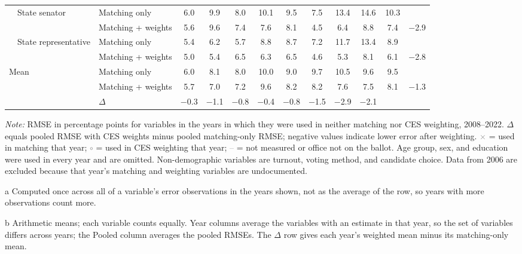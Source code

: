 \begin{table}[!htbp]
{\begin{threeparttable}
\begin{tabular}{llcccccccccc}
\addlinespace[0.1em]
~~State senator & Matching only & 6.0 & 9.9 & 8.0 & 10.1 & 9.5 & 7.5 & 13.4 & 14.6 & 10.3 & \\
 & Matching + weights & 5.6 & 9.6 & 7.4 & 7.6 & 8.1 & 4.5 & 6.4 & 8.8 & 7.4 & $-$2.9 \\
\addlinespace[0.1em]
~~State representative & Matching only & 5.4 & 6.2 & 5.7 & 8.8 & 8.7 & 7.2 & 11.7 & 13.4 & 8.9 & \\
 & Matching + weights & 5.0 & 5.4 & 6.5 & 6.3 & 6.5 & 4.6 & 5.3 & 8.1 & 6.1 & $-$2.8 \\
\midrule
Mean\tnote{b} & Matching only & 6.0 & 8.1 & 8.0 & 10.0 & 9.0 & 9.7 & 10.5 & 9.6 & 9.5 & \\
 & Matching + weights & 5.7 & 7.0 & 7.2 & 9.6 & 8.2 & 8.2 & 7.6 & 7.5 & 8.1 & $-$1.3 \\
 & $\Delta$ & $-$0.3 & $-$1.1 & $-$0.8 & $-$0.4 & $-$0.8 & $-$1.5 & $-$2.9 & $-$2.1 & & \\
\bottomrule
\end{tabular}
\begin{tablenotes}
\footnotesize
\item \textit{Note:} RMSE in percentage points for variables in the years in which they were used in neither matching nor CES weighting, 2008--2022. $\Delta$ equals pooled RMSE with CES weights minus pooled matching-only RMSE; negative values indicate lower error after weighting. \textcolor{gray}{$\times$} = used in matching that year; \textcolor{gray}{$\circ$} = used in CES weighting that year; \textcolor{gray}{--} = not measured or office not on the ballot. Age group, sex, and education were used in every year and are omitted. Non-demographic variables are turnout, voting method, and candidate choice. Data from 2006 are excluded because that year's matching and weighting variables are undocumented.
\item[a] Computed once across all of a variable's error observations in the years shown, not as the average of the row, so years with more observations count more.
\item[b] Arithmetic means; each variable counts equally. Year columns average the variables with an estimate in that year, so the set of variables differs across years; the Pooled column averages the pooled RMSEs. The $\Delta$ row gives each year's weighted mean minus its matching-only mean.
\end{tablenotes}
\end{threeparttable}%
}
\end{table}